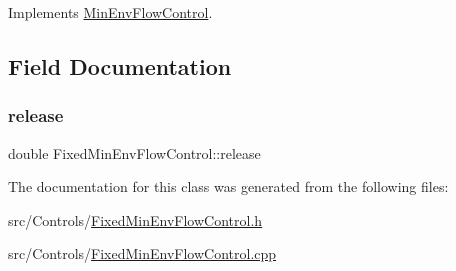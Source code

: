 Implements \mbox{\hyperlink{classMinEnvFlowControl_a5de79615852eb0c937dd559a9eb9402d_a5de79615852eb0c937dd559a9eb9402d}{Min\+Env\+Flow\+Control}}.



\subsection{Field Documentation}
\mbox{\label{classFixedMinEnvFlowControl_a16665ce65b1fe997390eb913926bd229_a16665ce65b1fe997390eb913926bd229}} 
\subsubsection{\texorpdfstring{release}{release}}
{\footnotesize\ttfamily double Fixed\+Min\+Env\+Flow\+Control\+::release\hspace{0.3cm}{\ttfamily [private]}}



The documentation for this class was generated from the following files\+:\begin{DoxyCompactItemize}
\item 
src/\+Controls/\mbox{\hyperlink{FixedMinEnvFlowControl_8h}{Fixed\+Min\+Env\+Flow\+Control.\+h}}\item 
src/\+Controls/\mbox{\hyperlink{FixedMinEnvFlowControl_8cpp}{Fixed\+Min\+Env\+Flow\+Control.\+cpp}}\end{DoxyCompactItemize}

